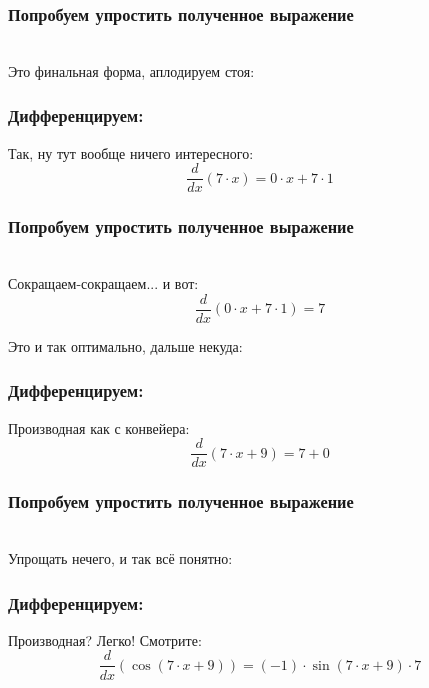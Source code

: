 \documentclass[a4paper,12pt]{article}
\begin{document}
\subsubsection*{Попробуем упростить полученное выражение}
\\Это финальная форма, аплодируем стоя:

\subsubsection*{Дифференцируем:}

Так, ну тут вообще ничего интересного:
\begin{dmath}\frac{d}{dx}\left(7\cdot x\right)=0\cdot x+ 7\cdot 1\end{dmath}
\subsubsection*{Попробуем упростить полученное выражение}
\\Сокращаем-сокращаем... и вот:\\
\begin{dmath}
	\frac{d}{dx}\left(0\cdot x+ 7\cdot 1\right) = 7\end{dmath}

Это и так оптимально, дальше некуда:

\subsubsection*{Дифференцируем:}

Производная как с конвейера:
\begin{dmath}\frac{d}{dx}\left(7\cdot x+ 9\right)=7+ 0\end{dmath}
\subsubsection*{Попробуем упростить полученное выражение}
\\Упрощать нечего, и так всё понятно:

\subsubsection*{Дифференцируем:}

Производная? Легко! Смотрите:
\begin{dmath}\frac{d}{dx}\left(\operatorname{cos}\left(7\cdot x+ 9\right) \right)=(-1)\cdot \operatorname{sin}\left(7\cdot x+ 9\right) \cdot 7\end{dmath}
\end{document}
